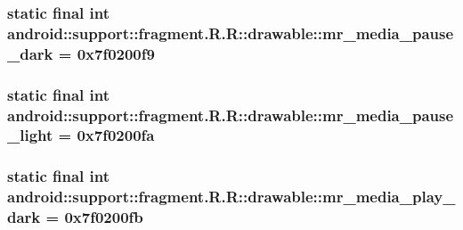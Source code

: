 \hypertarget{classandroid_1_1support_1_1fragment_1_1_r_1_1drawable_6fa0da525e7ddcc62a2245302fef0feb}{
\subsubsection[{mr\_\-media\_\-pause\_\-dark}]{\setlength{\rightskip}{0pt plus 5cm}static final int android::support::fragment.R.R::drawable::mr\_\-media\_\-pause\_\-dark = 0x7f0200f9}}
\label{classandroid_1_1support_1_1fragment_1_1_r_1_1drawable_6fa0da525e7ddcc62a2245302fef0feb}


\hypertarget{classandroid_1_1support_1_1fragment_1_1_r_1_1drawable_55843e14f9f090984ca32a75b1fe638e}{
\subsubsection[{mr\_\-media\_\-pause\_\-light}]{\setlength{\rightskip}{0pt plus 5cm}static final int android::support::fragment.R.R::drawable::mr\_\-media\_\-pause\_\-light = 0x7f0200fa}}
\label{classandroid_1_1support_1_1fragment_1_1_r_1_1drawable_55843e14f9f090984ca32a75b1fe638e}


\hypertarget{classandroid_1_1support_1_1fragment_1_1_r_1_1drawable_408bb502e619abdaa014aaac4f3557fb}{
\subsubsection[{mr\_\-media\_\-play\_\-dark}]{\setlength{\rightskip}{0pt plus 5cm}static final int android::support::fragment.R.R::drawable::mr\_\-media\_\-play\_\-dark = 0x7f0200fb}}
\label{classandroid_1_1support_1_1fragment_1_1_r_1_1drawable_408bb502e619abdaa014aaac4f3557fb}


